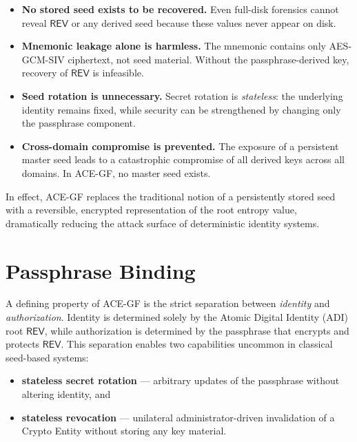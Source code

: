 \documentclass[12pt,a4paper]{article}
\begin{document}
  \begin{itemize}

   \item \textbf{No stored seed exists to be recovered.}
   Even full-disk forensics cannot reveal $\mathsf{REV}$ or any derived seed
   because these values never appear on disk.

   \item \textbf{Mnemonic leakage alone is harmless.}
   The mnemonic contains only AES-GCM-SIV ciphertext, not seed material.
   Without the passphrase-derived key, recovery of $\mathsf{REV}$ is infeasible.

   \item \textbf{Seed rotation is unnecessary.}
   Secret rotation is \emph{stateless}: the underlying identity remains fixed,
   while security can be strengthened by changing only the passphrase component.

   \item \textbf{Cross-domain compromise is prevented.}
   The exposure of a persistent master seed leads to a catastrophic compromise of all derived keys across all domains.
   In ACE-GF, no master seed exists.

  \end{itemize}
  In effect, ACE-GF replaces the traditional notion of a persistently stored
  seed with a reversible, encrypted representation of the root entropy value,
  dramatically reducing the attack surface of deterministic identity systems.

  \section{Passphrase Binding}

  A defining property of ACE-GF is the strict separation between
  \emph{identity} and \emph{authorization}.
  Identity is determined solely by the Atomic Digital Identity (ADI) root
  $\mathsf{REV}$, while authorization is determined by the passphrase that
  encrypts and protects $\mathsf{REV}$.
  This separation enables two capabilities uncommon in classical seed-based
  systems:

  \begin{itemize}
   \item \textbf{stateless secret rotation} — arbitrary updates of the passphrase
   without altering identity, and
   \item \textbf{stateless revocation} — unilateral administrator-driven invalidation
   of a Crypto Entity without storing any key material.
  \end{itemize}
\end{document}
